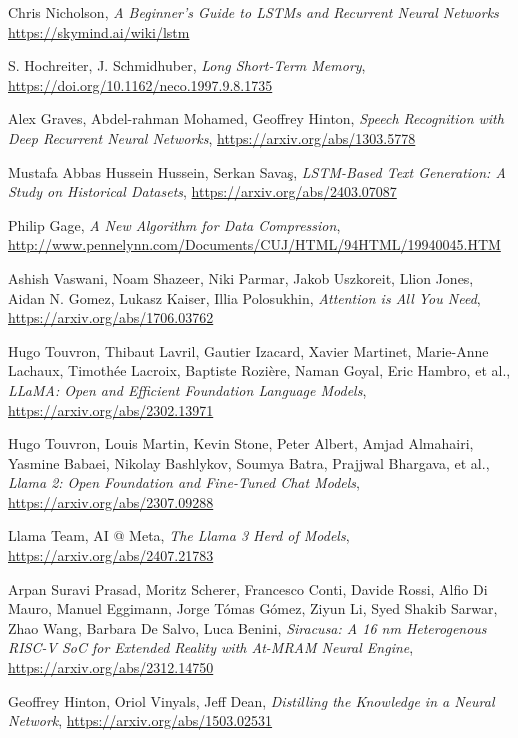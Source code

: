 \begin{thebibliography}{9}
	Chris Nicholson,
	\textit{A Beginner’s Guide to LSTMs and Recurrent Neural Networks}
	\url{https://skymind.ai/wiki/lstm}

	S. Hochreiter, J. Schmidhuber,
	\textit{Long Short-Term Memory},
	\url{https://doi.org/10.1162/neco.1997.9.8.1735}

	Alex Graves, Abdel-rahman Mohamed, Geoffrey Hinton,
	\textit{Speech Recognition with Deep Recurrent Neural Networks},
	\url{https://arxiv.org/abs/1303.5778}

	Mustafa Abbas Hussein Hussein, Serkan Savaş,
	\textit{LSTM-Based Text Generation: A Study on Historical Datasets},
	\url{https://arxiv.org/abs/2403.07087}

	Philip Gage,
	\textit{A New Algorithm for Data Compression},
	\url{http://www.pennelynn.com/Documents/CUJ/HTML/94HTML/19940045.HTM}

	Ashish Vaswani, Noam Shazeer, Niki Parmar, Jakob Uszkoreit, Llion Jones, Aidan N. Gomez, Lukasz Kaiser, Illia Polosukhin,
	\textit{Attention is All You Need},
	\url{https://arxiv.org/abs/1706.03762}

	Hugo Touvron, Thibaut Lavril, Gautier Izacard, Xavier Martinet, Marie-Anne Lachaux, Timothée Lacroix, Baptiste Rozière, Naman Goyal, Eric Hambro, et al.,
	\textit{LLaMA: Open and Efficient Foundation Language Models},
	\url{https://arxiv.org/abs/2302.13971}

	Hugo Touvron, Louis Martin, Kevin Stone, Peter Albert, Amjad Almahairi, Yasmine Babaei, Nikolay Bashlykov, Soumya Batra, Prajjwal Bhargava, et al.,
	\textit{Llama 2: Open Foundation and Fine-Tuned Chat Models},
	\url{https://arxiv.org/abs/2307.09288}

	Llama Team, AI @ Meta,
	\textit{The Llama 3 Herd of Models},
	\url{https://arxiv.org/abs/2407.21783}

	Arpan Suravi Prasad, Moritz Scherer, Francesco Conti, Davide Rossi, Alfio Di Mauro, Manuel Eggimann, Jorge Tómas Gómez, Ziyun Li, Syed Shakib Sarwar, Zhao Wang, Barbara De Salvo, Luca Benini,
	\textit{Siracusa: A 16 nm Heterogenous RISC-V SoC for Extended Reality with At-MRAM Neural Engine},
	\url{https://arxiv.org/abs/2312.14750}
	
	Geoffrey Hinton, Oriol Vinyals, Jeff Dean,
	\textit{Distilling the Knowledge in a Neural Network},
	\url{https://arxiv.org/abs/1503.02531}
	

\end{thebibliography}
